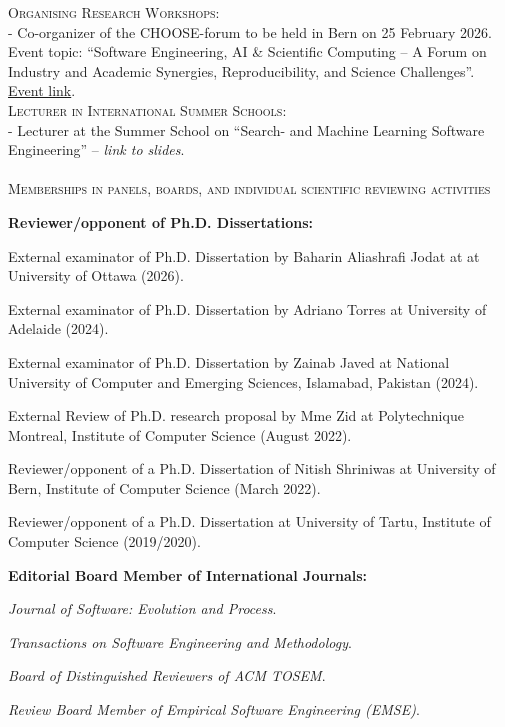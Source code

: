 \documentclass[11pt]{article}
\begin{document}
\textsc{Organising Research Workshops:}
\medskip \\ 
- Co-organizer of the CHOOSE-forum to be held in Bern on 25 February 2026. Event topic: ``Software Engineering, AI \& Scientific Computing -- A Forum on Industry and Academic Synergies, Reproducibility, and Science Challenges''. \href{https://se2026.inf.unibe.ch/en/choose-forum/}{Event link}.\\


\textsc{Lecturer in International Summer Schools:}
\medskip \\
- Lecturer at the Summer School on ``Search- and Machine Learning Software Engineering'' – \textit{link to slides}.\\

\medskip\medskip \\
\textsc{Memberships in panels, boards, and individual scientific reviewing activities}

\medskip 

\textbf{Reviewer/opponent of Ph.D. Dissertations:}
\begin{innerlist}
   \item External examinator of Ph.D. Dissertation   by Baharin Aliashrafi Jodat at at University of Ottawa (2026). 
   \item External examinator of Ph.D. Dissertation by Adriano Torres at University of Adelaide (2024).
   \item External examinator of Ph.D. Dissertation by Zainab Javed at National University of Computer and Emerging Sciences, Islamabad, Pakistan (2024).
   \item External Review of Ph.D. research proposal by Mme Zid at Polytechnique Montreal, Institute of Computer Science (August 2022).
   \item Reviewer/opponent of a Ph.D. Dissertation of Nitish Shriniwas at University of Bern, Institute of Computer Science (March 2022).
   \item Reviewer/opponent of a Ph.D. Dissertation at University of Tartu, Institute of Computer Science (2019/2020).
\end{innerlist}

\medskip 

\textbf{Editorial Board Member of International Journals:}
\begin{innerlist}
   \item \emph{Journal of Software: Evolution and Process}.
   \item \emph{Transactions on Software Engineering and Methodology}.
   \item \emph{Board of Distinguished Reviewers of ACM TOSEM}.
   \item \emph{Review Board Member of Empirical Software Engineering (EMSE)}.
\end{innerlist}
\end{document}
